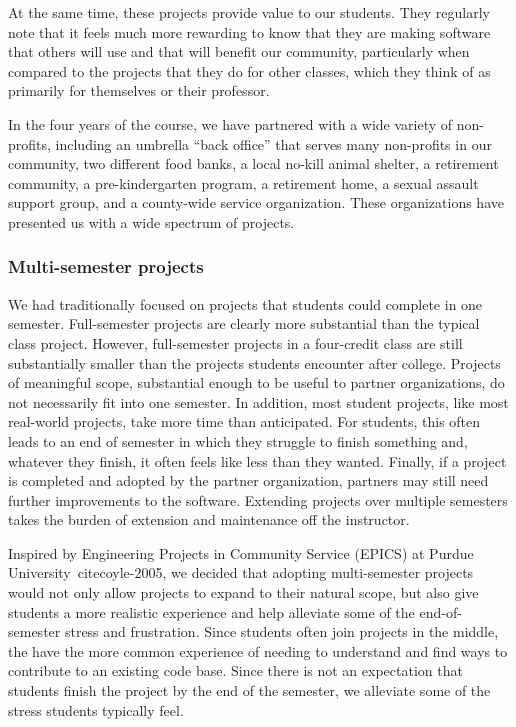 At the same time, these projects provide value to our students.  They
regularly note that it feels much more rewarding to know that they are
making software that others will use and that will benefit our community,
particularly when compared to the projects that they do for other classes,
which they think of as primarily for themselves or their professor.

In the four years of the course, we have partnered with a wide
variety of non-profits, including an umbrella ``back office'' that
serves many non-profits in our community, two different food banks,
a local no-kill animal shelter, a retirement community, a
pre-kindergarten program, a retirement home, a sexual assault support
group, and a county-wide service organization.  These organizations
have presented us with a wide spectrum of projects.

\subsubsection{Multi-semester projects}

We had traditionally focused on projects that students could complete
in one semester.  Full-semester projects are clearly more substantial
than the typical class project.  However, full-semester projects
in a four-credit class are still substantially smaller than the
projects students encounter after college. 
Projects of meaningful scope, substantial enough to be useful to 
partner organizations, do not necessarily fit into one semester. 
In addition, most student projects, like most real-world projects,
take more time than anticipated.  For students, this often leads
to an end of semester in which they struggle to finish something
and, whatever they finish, it often feels like less than they wanted.
Finally, if a project is completed and adopted by the partner organization, 
partners may still need further improvements to the software. 
Extending projects over multiple semesters takes the burden of 
extension and maintenance off the instructor.

Inspired by Engineering Projects in Community Service (EPICS) at 
Purdue University~cite{coyle-2005}, 
we decided that adopting multi-semester projects would not only 
allow projects to expand to their natural scope, but also
give students a more realistic experience and help
alleviate some of the end-of-semester stress and frustration.  Since
students often join projects in the middle, the have the more common
experience of needing to understand and find ways to contribute to
an existing code base.  Since there is not an expectation that
students finish the project by the end of the semester, we alleviate
some of the stress students typically feel.

